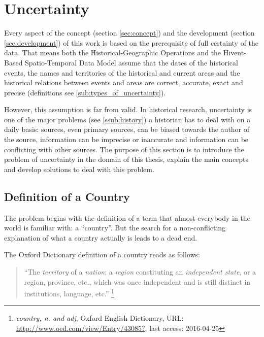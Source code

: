 
\section{Uncertainty} %
\label{sec:uncertainty}

Every aspect of the concept (section \ref{sec:concept}) and the development (section \ref{sec:development}) of this work is based on the prerequisite of full certainty of the data. That means both the Historical-Geographic Operations and the Hivent-Based Spatio-Temporal Data Model assume that the dates of the historical events, the names and territories of the historical and current areas and the historical relations between events and areas are correct, accurate, exact and precise (definitions see \ref{sub:types_of_uncertainty}).

However, this assumption is far from valid. In historical research, uncertainty is one of the major problems (see \ref{ssub:history}) a historian has to deal with on a daily basis: sources, even primary sources, can be biased towards the author of the source, information can be imprecise or inaccurate and information can be conflicting with other sources. The purpose of this section is to introduce the problem of uncertainty in the domain of this thesis, explain the main concepts and develop solutions to deal with this problem.


\subsection{Definition of a Country} %
\label{sub:definition_of_a_country}

The problem begins with the definition of a term that almost everybody in the world is familiar with: a ``country''. But the search for a non-conflicting explanation of what a country actually is leads to a dead end.

The Oxford Dictionary definition of a country reads as follows:
\begin{quote}
  ``The \emph{territory} of a \emph{nation}; a \emph{region} constituting an \emph{independent state}, or a region, province, etc., which was once independent and is still distinct in institutions, language, etc.''
  \footnote{\textit{country, n. and adj}, Oxford English Dictionary, URL: \url{http://www.oed.com/view/Entry/43085?}, last access: 2016-04-25}
\end{quote}

